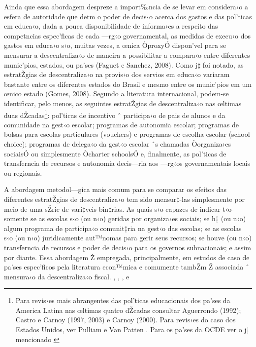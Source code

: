\documentclass[a4paper, 12pt]{article}
\begin{document}
Ainda que essa abordagem despreze a import‰ncia de se levar em considera‹o a esfera de autoridade que detm o poder de decis‹o acerca dos gastos e das pol’ticas em educa‹o, dada a pouca disponibilidade de informa›es a respeito das competncias espec’ficas de cada —rg‹o governamental, as medidas de execu‹o dos gastos em educa‹o s‹o, muitas vezes, a œnica ÒproxyÓ dispon’vel para se mensurar a descentraliza‹o de maneira a possibilitar a compara‹o entre diferentes munic’pios, estados, ou pa’ses (Faguet e Sanchez, 2008).
Como j‡ foi notado, as estratŽgias de descentraliza‹o na provis‹o dos servios em educa‹o variaram bastante entre os diferentes estados do Brasil e mesmo entre os munic’pios em um œnico estado (Gomes, 2008). Segundo a literatura internacional, podem-se identificar, pelo menos, as seguintes estratŽgias de descentraliza‹o nas œltimas duas dŽcadas\footnote{Para revis›es mais abrangentes das pol’ticas educacionais dos pa’ses da America Latina nas œltimas quatro dŽcadas consultar Aguerrondo (1992); Castro e Carnoy (1997, 2003) e Carnoy (2000). Para revis›es do caso dos Estados Unidos, ver Pulliam e Van Patten \citeyear{pulliam_history_2006}. Para os pa’ses da OCDE ver o j‡ mencionado \citeyear{oecd_education_1998}}: pol’ticas de incentivo ˆ participa‹o de pais de alunos e da comunidade na gest‹o escolar; programas de autonomia escolar; programas de bolsas para escolas particulares (vouchers) e programas de escolha escolar (school choice); programas de delega‹o da gest‹o escolar ˆs chamadas Òorganiza›es sociaisÓ ou simplesmente Òcharter schoolsÓ e, finalmente, as pol’ticas de transferncia de recursos e autonomia decis—ria aos —rg‹os governamentais locais ou regionais.

A abordagem metodol—gica mais comum para se comparar os efeitos das diferentes estratŽgias de descentraliza‹o tem sido mensur‡-las simplesmente por meio de uma sŽrie de vari‡veis bin‡rias. As quais s‹o capazes de indicar t‹o-somente se as escolas s‹o (ou n‹o) geridas por organiza›es sociais; se h‡ (ou n‹o) algum programa de participa‹o comunit‡ria na gest‹o das escolas; se as escolas s‹o (ou n‹o) juridicamente aut™nomas para gerir seus recursos; se houve (ou n‹o) transferncia de recursos e poder de decis‹o para os governos subnacionais; e assim por diante. Essa abordagem Ž empregada, principalmente, em estudos de caso de pa’ses espec’ficos pela literatura econ™mica e comumente tambŽm Ž associada ˆ mensura‹o da descentraliza‹o fiscal. \cite{lee_schooling_2001}, \cite{hanushek_does_2003}, \cite{hoxby_does_2000}, e \cite{hanushek_economics_1986}
\end{document}
